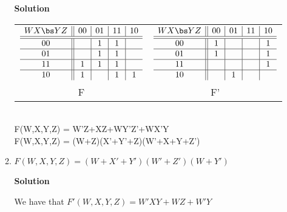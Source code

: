 \begin{enumerate}
\begin{enumerate}
                \begin{onlysolution}  \textbf{Solution} \itshape{
                        \begin{tabular}{cc}
                            $
                            \begin{array} {c||c|c|c|c}
                                W X \bs Y Z   & 00 & 01 & 11 & 10 \\ \hline \hline
                                00        &    & 1  & 1  &    \\ \hline
                                01        &    & 1  & 1  &    \\ \hline
                                11        & 1  & 1  & 1  &    \\ \hline
                                10        & 1  &    & 1  & 1  \\
                            \end{array}$ &
                            $
                            \begin{array} {c||c|c|c|c}
                                W X \bs Y Z   & 00 & 01 & 11 & 10 \\ \hline \hline
                                00        & 1  &    &    & 1  \\ \hline
                                01        & 1  &    &    & 1  \\ \hline
                                11        &    &    &    & 1  \\ \hline
                                10        &    & 1  &    &    \\
                            \end{array}$ \\
                            F  & F' \\
                        \end{tabular} \\
                        \SOPmin F(W,X,Y,Z) =  W'Z+XZ+WY'Z'+WX'Y\\
                        \POSmin F(W,X,Y,Z) = (W+Z)(X'+Y'+Z)(W'+X+Y+Z')
                    }
                \end{onlysolution}

            \item  $F(W,X,Y,Z) = (W + X'+Y')(W'+Z')(W+Y')$

                \begin{onlysolution}  \textbf{Solution} \itshape{

                        We have that $F'(W,X,Y,Z) = W'XY+ WZ+ W'Y$

}
\end{onlysolution}
\end{enumerate}
\end{enumerate}
